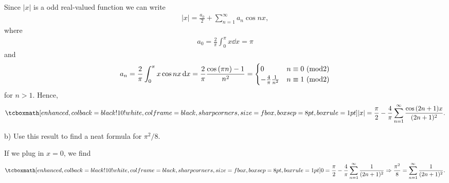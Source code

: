 Since $|x|$ is a odd real-valued function we can write 
\begin{eqnarray}
    \label{eq:|x|-fourier-1}
    |x| = \frac{a_0}{2} + \sum_{n=1}^{\infty} a_{n}\cos{nx} 
,\end{eqnarray}
where
\begin{eqnarray}
    \label{eq:a0}
    a_0 = \frac{2}{\pi}\int_{0}^{\pi} x \dd{x} = \pi
\end{eqnarray}
and
\begin{eqnarray}
    \label{eq:an-bn}
    a_{n} = \frac{2}{\pi} \int_{0}^{\pi} x\cos{nx} \dd{x} = \frac{2}{\pi}\frac{\cos{(\pi n)} - 1}{n^2} = 
    \begin{cases}
        0 & n \equiv 0 ~ ({\rm mod} 2) \\
        -\frac{4}{\pi}\frac{1}{n^2} & n \equiv 1 ~ ({\rm mod} 2)
    \end{cases}
\end{eqnarray}
for $n > 1$.
Hence, 
\begin{eqnarray}
    \label{eq:|x|-fourier-2}
    \eqbox{
    |x| = \frac{\pi}{2} - \frac{4}{\pi} \sum_{n=1}^{\infty} \frac{ \cos{(2n+1)x} }{(2n+1)^2}
}
.\end{eqnarray}


b) Use this result to find a neat formula for $\pi^2/8$.

If we plug in $x = 0$, we find
\begin{eqnarray}
    \label{eq:pisq-8}
    \eqbox{
    0 = \frac{\pi}{2} - \frac{4}{\pi}\sum_{n=1}^{\infty} \frac{1}{(2n+1)^2} \Rightarrow \frac{\pi^2}{8} = \sum_{n=1}^{\infty} \frac{1}{(2n+1)^2}
}
.\end{eqnarray}





